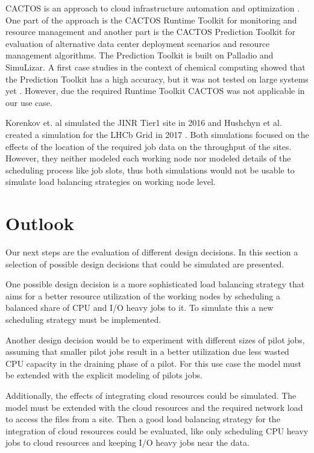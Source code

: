 \documentclass[a4paper]{jpconf}
\begin{document}
CACTOS is an approach to cloud infrastructure automation and optimization \cite{cactos}.
One part of the approach is the CACTOS Runtime Toolkit for monitoring and resource management and another part is the CACTOS Prediction Toolkit for evaluation of alternative data center deployment scenarios and resource management algorithms. The Prediction Toolkit is built on Palladio and SimuLizar.
A first case studies in the context of chemical computing showed that the Prediction Toolkit has a high accuracy, but it was not tested on large systems yet \cite{rapidtesting}. However, due the required Runtime Toolkit CACTOS was not applicable in our use case.

Korenkov et. al simulated the JINR Tier1 site in 2016 \cite{jinr} and Hushchyn et al. created a simulation for the LHCb Grid in 2017 \cite{lhcb}. Both simulations focused on the effects of the location of the required job data on the throughput of the sites.
However, they neither modeled each working node nor modeled details of the scheduling process like job slots, thus both simulations would not be usable to simulate load balancing strategies on working node level.


\section{Outlook}
\label{outlook}
Our next steps are the evaluation of different design decisions. In this section a selection of possible design decisions that could be simulated are presented.

One possible design decision is a more sophisticated load balancing strategy that aims for a better resource utilization of the working nodes by scheduling a balanced share of CPU and I/O heavy jobs to it. To simulate this a new scheduling strategy must be implemented.

Another design decision would be to experiment with different sizes of pilot jobs, assuming that smaller pilot jobs result in a better utilization due less wasted CPU capacity in the draining phase of a pilot. For this use case the model must be extended with the explicit modeling of pilots jobs.

Additionally, the effects of integrating cloud resources could be simulated. The model must be extended with the cloud resources and the required network load to access the files from a site. Then a good load balancing strategy for the  integration of cloud resources could be evaluated, like only scheduling CPU heavy jobs to cloud resources and keeping I/O heavy jobs near the data.
\end{document}
